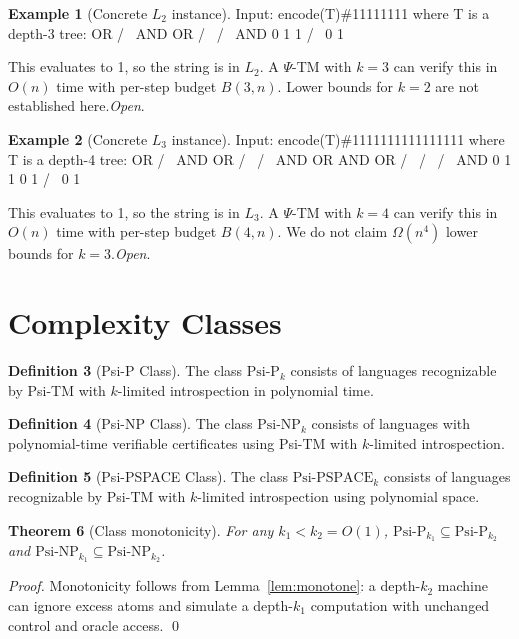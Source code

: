 \documentclass[11pt]{article}
\newtheorem{theorem}{Theorem}[section]
\theoremstyle{definition}
\newtheorem{definition}[theorem]{Definition}
\newtheorem{example}[theorem]{Example}
\newcommand{\PSi}{\Psi}
\begin{document}
\begin{example}[Concrete $L_2$ instance]
Input: encode(T)\#11111111 where T is a depth-3 tree:
        OR
       /  \
      AND  OR
     /  \  / \
    AND  0 1  1
   /  \
  0    1

This evaluates to 1, so the string is in $L_2$.
A $\PSi$-TM with $k=3$ can verify this in $O(n)$ time with per-step budget $B(3,n)$. Lower bounds for $k=2$ are not established here.\;\emph{Open}.
\end{example}

\begin{example}[Concrete $L_3$ instance]
Input: encode(T)\#1111111111111111 where T is a depth-4 tree:
         OR
        /  \
       AND  OR
      /  \  / \
     AND  OR AND OR
    /  \  / \  / \
   AND  0 1  1 0  1
  /  \
 0    1

This evaluates to 1, so the string is in $L_3$.
A $\PSi$-TM with $k=4$ can verify this in $O(n)$ time with per-step budget $B(4,n)$. We do not claim $\Omega(n^4)$ lower bounds for $k=3$.\;\emph{Open}.
\end{example}

\section{Complexity Classes}

\begin{definition}[Psi-P Class]
The class $\text{Psi-P}_k$ consists of languages recognizable by Psi-TM with $k$-limited introspection in polynomial time.
\end{definition}

\begin{definition}[Psi-NP Class]
The class $\text{Psi-NP}_k$ consists of languages with polynomial-time verifiable certificates using Psi-TM with $k$-limited introspection.
\end{definition}

\begin{definition}[Psi-PSPACE Class]
The class $\text{Psi-PSPACE}_k$ consists of languages recognizable by Psi-TM with $k$-limited introspection using polynomial space.
\end{definition}

\begin{theorem}[Class monotonicity]
For any $k_1 < k_2 = O(1)$, $\text{Psi-P}_{k_1} \subseteq \text{Psi-P}_{k_2}$ and $\text{Psi-NP}_{k_1} \subseteq \text{Psi-NP}_{k_2}$.
\end{theorem}
\begin{proof}
Monotonicity follows from Lemma~\ref{lem:monotone}: a depth-$k_2$ machine can ignore excess atoms and simulate a depth-$k_1$ computation with unchanged control and oracle access. \qed
\end{proof}
\end{document}
